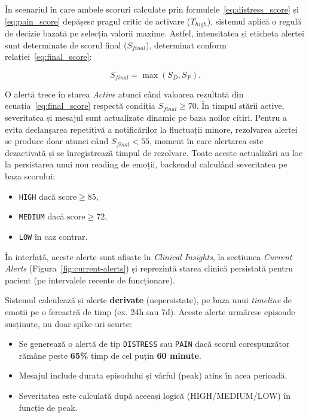 În scenariul în care ambele scoruri calculate prin formulele~\eqref{eq:distress_score} și \eqref{eq:pain_score} depășesc pragul critic de activare ($T_{high}$), sistemul aplică o regulă de decizie bazată pe selecția valorii maxime. Astfel, intensitatea și eticheta alertei sunt determinate de scorul final ($S_{final}$), determinat conform relației~\eqref{eq:final_score}:

\begin{equation}
    S_{final} = \max(S_D, S_P).
    \label{eq:final_score}
\end{equation}

O alertă trece în starea \textit{Active} atunci când valoarea rezultată din ecuația~\eqref{eq:final_score} respectă condiția $S_{final} \geq 70$. În timpul stării active, severitatea și mesajul sunt actualizate dinamic pe baza noilor citiri. Pentru a evita declanșarea repetitivă a notificărilor la fluctuații minore, rezolvarea alertei se produce doar atunci când $S_{final} < 55$, moment în care alertarea este dezactivată și se înregistrează timpul de rezolvare.
Toate aceste actualizări au loc la persistarea unui nou reading de emoții, backendul calculând severitatea pe baza scorului:
  \begin{itemize}[noitemsep]
    \item \texttt{HIGH} dacă $\text{score} \ge 85$,
    \item \texttt{MEDIUM} dacă $\text{score} \ge 72$,
    \item \texttt{LOW} în caz contrar.
  \end{itemize}
În interfață, aceste alerte sunt afișate în \textit{Clinical Insights}, la secțiunea \textit{Current Alerts} (Figura~\ref{fig:current-alerts}) și reprezintă starea clinică persistată pentru pacient (pe intervalele recente de funcționare).

Sistemul calculează și alerte \textbf{derivate} (nepersistate), pe baza unui \textit{timeline} de emoții pe o fereastră de timp
(ex. 24h sau 7d). Aceste alerte urmăresc episoade susținute, nu doar spike-uri scurte:

\begin{itemize}[noitemsep]
  \item Se generează o alertă de tip \texttt{DISTRESS} sau \texttt{PAIN} dacă scorul corespunzător rămâne peste \textbf{65\%}
        timp de cel puțin \textbf{60 minute}.
  \item Mesajul include durata episodului și vârful (peak) atins în acea perioadă.
  \item Severitatea este calculată după aceeași logică (HIGH/MEDIUM/LOW) în func\-ți\-e de peak.
\end{itemize}

